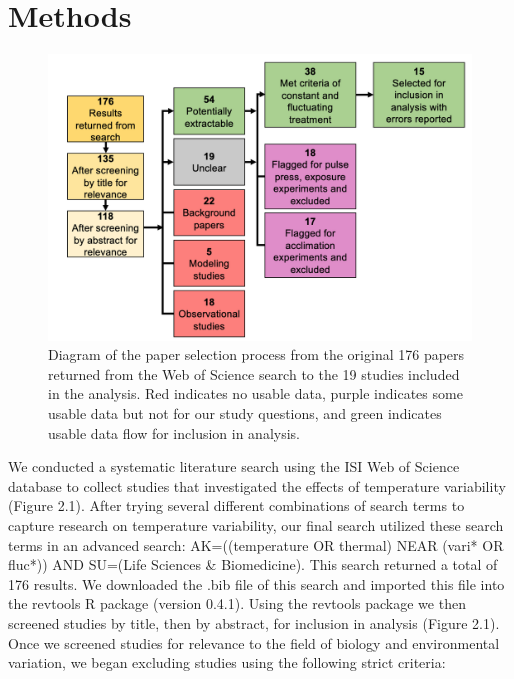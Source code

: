 \documentclass[12pt,twoside]{reedthesis}
\begin{document}
\hypertarget{methods}{%
\chapter{Methods}\label{methods}}
\begin{figure}

{\centering \includegraphics[width=0.9\linewidth]{figures/figure5} 

}

\caption[Meta-analysis paper selection process]{Diagram of the paper selection process from the original 176 papers returned from the Web of Science search to the 19 studies included in the analysis. Red indicates no usable data, purple indicates some usable data but not for our study questions, and green indicates usable data flow for inclusion in analysis.}\label{fig:unnamed-chunk-7}
\end{figure}
We conducted a systematic literature search using the ISI Web of Science database to collect studies that investigated the effects of temperature variability (Figure 2.1). After trying several different combinations of search terms to capture research on temperature variability, our final search utilized these search terms in an advanced search: AK=((temperature OR thermal) NEAR (vari* OR fluc*)) AND SU=(Life Sciences \& Biomedicine). This search returned a total of 176 results. We downloaded the .bib file of this search and imported this file into the revtools R package (version 0.4.1). Using the revtools package we then screened studies by title, then by abstract, for inclusion in analysis (Figure 2.1). Once we screened studies for relevance to the field of biology and environmental variation, we began excluding studies using the following strict criteria:
\end{document}
